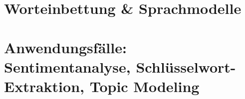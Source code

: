     
 
    
\section{Worteinbettung \& Sprachmodelle}

\section{Anwendungsfälle: Sentimentanalyse, Schlüsselwort-Extraktion, Topic Modeling}